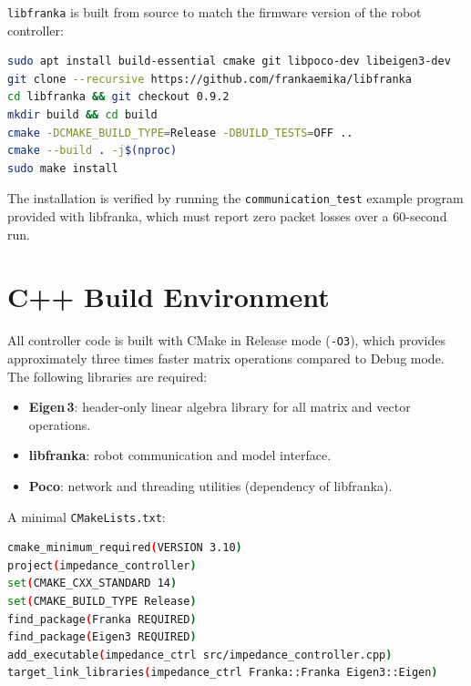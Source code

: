 \texttt{libfranka} is built from source to match the firmware version of
the robot controller:

\begin{lstlisting}[style=cppstyle, language=bash,
  caption={Build and install libfranka from source},
  label={lst:libfranka}]
sudo apt install build-essential cmake git libpoco-dev libeigen3-dev
git clone --recursive https://github.com/frankaemika/libfranka
cd libfranka && git checkout 0.9.2
mkdir build && cd build
cmake -DCMAKE_BUILD_TYPE=Release -DBUILD_TESTS=OFF ..
cmake --build . -j$(nproc)
sudo make install
\end{lstlisting}

The installation is verified by running the
\texttt{communication\_test} example program provided with libfranka,
which must report zero packet losses over a 60-second run.

\section{C++ Build Environment}
\label{sec:cpp_env}

All controller code is built with CMake in Release mode (\texttt{-O3}),
which provides approximately three times faster matrix operations compared
to Debug mode.
The following libraries are required:

\begin{itemize}
  \item \textbf{Eigen\,3}: header-only linear algebra library for all
        matrix and vector operations.
  \item \textbf{libfranka}: robot communication and model interface.
  \item \textbf{Poco}: network and threading utilities (dependency of
        libfranka).
\end{itemize}

A minimal \texttt{CMakeLists.txt}:

\begin{lstlisting}[style=cppstyle, language=bash,
  caption={Minimal CMakeLists.txt for a libfranka controller},
  label={lst:cmake}]
cmake_minimum_required(VERSION 3.10)
project(impedance_controller)
set(CMAKE_CXX_STANDARD 14)
set(CMAKE_BUILD_TYPE Release)
find_package(Franka REQUIRED)
find_package(Eigen3 REQUIRED)
add_executable(impedance_ctrl src/impedance_controller.cpp)
target_link_libraries(impedance_ctrl Franka::Franka Eigen3::Eigen)
\end{lstlisting}

